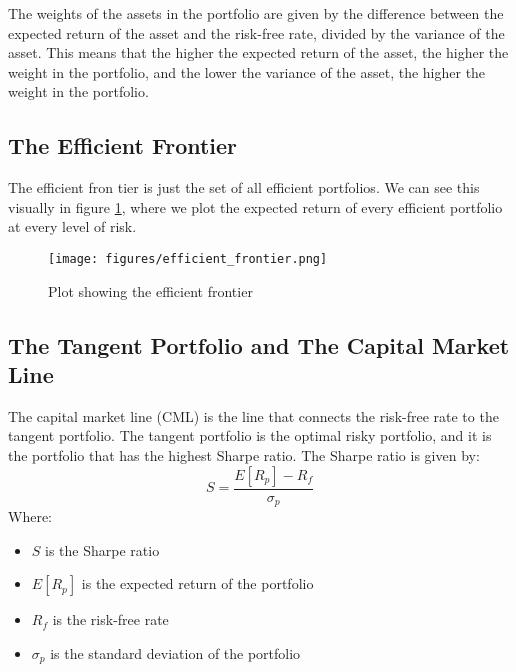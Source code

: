 The weights of the assets in the portfolio are given by the difference between the expected return of the asset and the risk-free rate, divided by the variance of the asset.
This means that the higher the expected return of the asset, the higher the weight in the portfolio, and the lower the variance of the asset, the higher the weight in the portfolio.

\subsection{The Efficient Frontier}
The efficient fron tier is just the set of all efficient portfolios.
We can see this visually in figure \ref{fig:efficient_frontier}, where we plot the expected return of every efficient portfolio at every level of risk.

\begin{figure}
    \centering
    \texttt{[image: figures/efficient\_frontier.png]}
    \caption{Plot showing the efficient frontier}
    \label{fig:efficient_frontier}
\end{figure}

\subsection{The Tangent Portfolio and The Capital Market Line}

The capital market line (CML) is the line that connects the risk-free rate to the tangent portfolio.
The tangent portfolio is the optimal risky portfolio, and it is the portfolio that has the highest Sharpe ratio.
The Sharpe ratio is given by:
\begin{equation}
    \label{eq:sharpe_ratio}
    S = \frac{E[R_p] - R_f}{\sigma_p}
\end{equation}
Where:
\begin{itemize}
    \item $S$ is the Sharpe ratio
    \item $E[R_p]$ is the expected return of the portfolio
    \item $R_f$ is the risk-free rate
    \item $\sigma_p$ is the standard deviation of the portfolio
\end{itemize}

